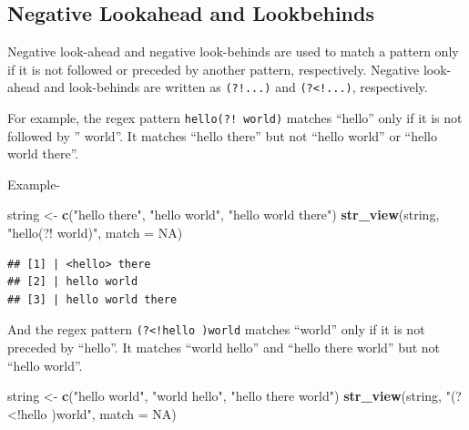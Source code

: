 \documentclass[
]{book}
\newenvironment{Shaded}{\begin{snugshade}}{\end{snugshade}}
\newcommand{\AttributeTok}[1]{\textcolor[rgb]{0.13,0.29,0.53}{#1}}
\newcommand{\ConstantTok}[1]{\textcolor[rgb]{0.56,0.35,0.01}{#1}}
\newcommand{\FunctionTok}[1]{\textcolor[rgb]{0.13,0.29,0.53}{\textbf{#1}}}
\newcommand{\NormalTok}[1]{#1}
\newcommand{\OtherTok}[1]{\textcolor[rgb]{0.56,0.35,0.01}{#1}}
\newcommand{\StringTok}[1]{\textcolor[rgb]{0.31,0.60,0.02}{#1}}
\begin{document}
\hypertarget{negative-lookahead-and-lookbehinds}{%
\subsection{Negative Lookahead and Lookbehinds}\label{negative-lookahead-and-lookbehinds}}

Negative look-ahead and negative look-behinds are used to match a pattern only if it is not followed or preceded by another pattern, respectively. Negative look-ahead and look-behinds are written as \texttt{(?!...)} and \texttt{(?\textless{}!...)}, respectively.

For example, the regex pattern \texttt{hello(?!\ world)} matches ``hello'' only if it is not followed by '' world''. It matches ``hello there'' but not ``hello world'' or ``hello world there''.

Example-

\begin{Shaded}
\begin{Highlighting}[]
\NormalTok{string }\OtherTok{\textless{}{-}} \FunctionTok{c}\NormalTok{(}\StringTok{"hello there"}\NormalTok{, }\StringTok{"hello world"}\NormalTok{, }\StringTok{"hello world there"}\NormalTok{)}
\FunctionTok{str\_view}\NormalTok{(string, }\StringTok{"hello(?! world)"}\NormalTok{, }\AttributeTok{match =} \ConstantTok{NA}\NormalTok{)}
\end{Highlighting}
\end{Shaded}

\begin{verbatim}
## [1] | <hello> there
## [2] | hello world
## [3] | hello world there
\end{verbatim}

And the regex pattern \texttt{(?\textless{}!hello\ )world} matches ``world'' only if it is not preceded by ``hello''. It matches ``world hello'' and ``hello there world'' but not ``hello world''.

\begin{Shaded}
\begin{Highlighting}[]
\NormalTok{string }\OtherTok{\textless{}{-}} \FunctionTok{c}\NormalTok{(}\StringTok{"hello world"}\NormalTok{, }\StringTok{"world hello"}\NormalTok{, }\StringTok{"hello there world"}\NormalTok{)}
\FunctionTok{str\_view}\NormalTok{(string, }\StringTok{"(?\textless{}!hello )world"}\NormalTok{, }\AttributeTok{match =} \ConstantTok{NA}\NormalTok{)}
\end{Highlighting}
\end{Shaded}
\end{document}
